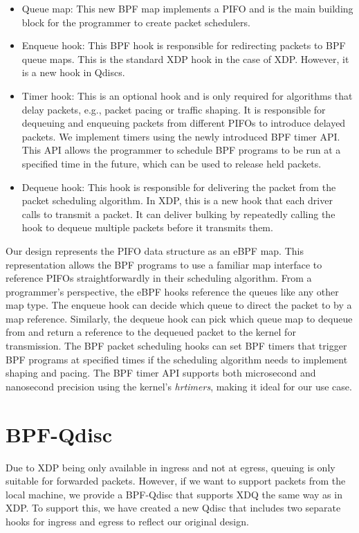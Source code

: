\documentclass[sigconf, nonacm]{acmart}
\begin{document}
\begin{itemize}
        \item Queue map: This new BPF map implements a PIFO and is the main building block for the programmer to create packet schedulers.
        \item Enqueue hook: This BPF hook is responsible for redirecting packets to BPF queue maps. This is the standard XDP hook in the case of XDP. However, it is a new hook in Qdiscs.
        \item Timer hook: This is an optional hook and is only required for algorithms that delay packets, e.g., packet pacing or traffic shaping. It is responsible for dequeuing and enqueuing packets from different PIFOs to introduce delayed packets. We implement timers using the newly introduced BPF timer API. This API allows the programmer to schedule BPF programs to be run at a specified time in the future, which can be used to release held packets.
        \item Dequeue hook: This hook is responsible for delivering the packet from the packet scheduling algorithm. In XDP, this is a new hook that each driver calls to transmit a packet. It can deliver bulking by repeatedly calling the hook to dequeue multiple packets before it transmits them.
\end{itemize}

Our design represents the PIFO data structure as an eBPF map. This representation allows the BPF programs to use a familiar map interface to reference PIFOs straightforwardly in their scheduling algorithm. From a programmer's perspective, the eBPF hooks reference the queues like any other map type. The enqueue hook can decide which queue to direct the packet to by a map reference. Similarly, the dequeue hook can pick which queue map to dequeue from and return a reference to the dequeued packet to the kernel for transmission. The BPF packet scheduling hooks can set BPF timers that trigger BPF programs at specified times if the scheduling algorithm needs to implement shaping and pacing. The BPF timer API supports both microsecond and nanosecond precision using the kernel's \textit{hrtimers}, making it ideal for our use case.


\section{BPF-Qdisc}

Due to XDP being only available in ingress and not at egress, queuing is only suitable for forwarded packets. However, if we want to support packets from the local machine, we provide a BPF-Qdisc that supports XDQ the same way as in XDP. To support this, we have created a new Qdisc that includes two separate hooks for ingress and egress to reflect our original design.
\end{document}
